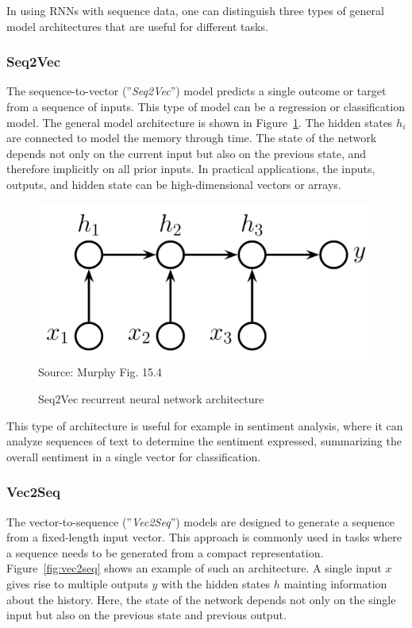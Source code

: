 In using RNNs with sequence data, one can distinguish three types of general model architectures that are useful for different tasks.

\subsubsection*{Seq2Vec}

The sequence-to-vector (''\emph{Seq2Vec}'') model predicts a single outcome or target from a sequence of inputs. This type of model can be a regression or classification model. The general model architecture is shown in Figure~\ref{fig:seqclassification}. The hidden states $h_i$ are connected to model the memory through time. The state of the network depends not only on the current input but also on the previous state, and therefore implicitly on all prior inputs. In practical applications, the inputs, outputs, and hidden state can be high-dimensional vectors or arrays.

\begin{figure}[b]
\centering
\includegraphics[width=.5\textwidth]{seqclassification} \\

\scriptsize Source: Murphy Fig. 15.4
\caption{Seq2Vec recurrent neural network architecture}
\label{fig:seqclassification}
\end{figure}

This type of architecture is useful for example in sentiment analysis, where it can analyze sequences of text to determine the sentiment expressed, summarizing the overall sentiment in a single vector for classification.

\subsubsection*{Vec2Seq}

The vector-to-sequence (''\emph{Vec2Seq}'') models are designed to generate a sequence from a fixed-length input vector. This approach is commonly used in tasks where a sequence needs to be generated from a compact representation. Figure~\ref{fig:vec2seq} shows an example of such an architecture. A single input $x$ gives rise to multiple outputs $y$ with the hidden states $h$ mainting information about the history. Here, the state of the network depends not only on the single input but also on the previous state and previous output. 

